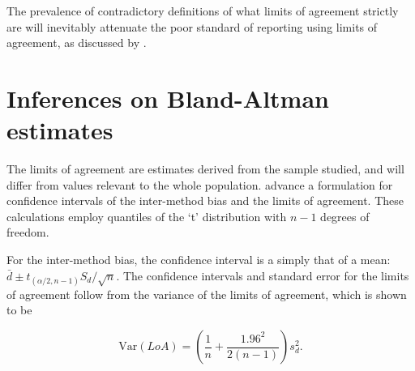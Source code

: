 \documentclass[12pt, a4paper]{report}
\theoremstyle{plain}
\theoremstyle{definition}
\theoremstyle{remark}
\begin{document}
The prevalence of contradictory definitions of what limits of agreement strictly are will inevitably attenuate the poor standard of reporting using limits of agreement, as discussed by \citet{mantha}.


















	\section{Inferences on Bland-Altman estimates}
	The limits of agreement are estimates derived from the sample
	studied, and will differ from values relevant to the whole
	population. \citet*{BA86} advance a formulation for confidence
	intervals of the inter-method bias and the limits of agreement.
	These calculations employ quantiles of the `t' distribution with
	$n -1$ degrees of freedom.
	
	For the inter-method bias, the confidence interval is a simply that of a mean: $\bar{d} \pm t_{(\alpha/2,n-1)} S_{d}/\sqrt{n}$.
	The confidence
	intervals and standard error for the limits of agreement follow from the variance of the limits of agreement, which is shown to be
	
	\[
	\mbox{Var}(LoA) = (\frac{1}{n}+\frac{1.96^{2}}{2(n-1)})s_{d}^{2}.
	\]
	
\end{document}
